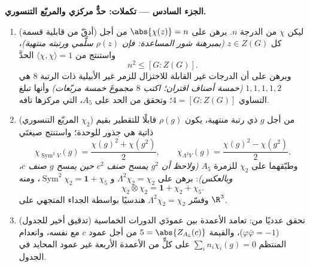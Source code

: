 \begin{problem}
\medskip
\noindent\textbf{الجزء السادس --- تكملات: حدٌّ مركزي والمربّع
التنسوري.}
\begin{enumerate}[resume]
  \item (أدقّ من قابلية قسمة) ليكن $\chi$  من
        الدرجة $n$. برهن على $\abs{\chi(z)} = n$ من أجل كل $z \in Z(G)$
        \emph{(بمبرهنة شور المساعدة: فإن $\rho(z)$ سلَّمي ورتبته
        منتهية)}، واستنتج من $\langle\chi, \chi\rangle = 1$ الحدَّ
        \[
        n^2 \leq [G : Z(G)] .
        \]
        وبرهن على أن الدرجات غير القابلة للاختزال للزمر غير
        الأبيلية ذات الرتبة $8$ هي $1, 1, 1, 1, 2$ \emph{(خمسة
        أصناف اقتران؛ اكتب $8$ مجموعَ خمسة مربّعات)} وأنها تبلغ
        التساوي $4 = [G : Z(G)]$؛ وتحقق من الحد على $A_5$، التي
        مركزها تافه.
  \item (المربّع التنسوري  $\chi_2$) من أجل $g$ ذي رتبة
        منتهية، يكون $\rho(g)$ قابلًا للتقطير بقيم ذاتية هي جذور
        للوحدة؛ واستنتج صيغتَي 
        \[
        \chi_{\operatorname{Sym}^2 V}(g)
        = \frac{\chi(g)^2 + \chi(g^2)}2,
        \qquad
        \chi_{\Lambda^2 V}(g)
        = \frac{\chi(g)^2 - \chi(g^2)}2 .
        \]
        وطبّقهما على $\chi_2$ للزمرة $A_5$ \emph{(ولاحظ أن $g^2$
        يمسح صنف $c^2$ حين يمسح $g$ صنف $c$، وبالعكس)}: برهن على
        $\Lambda^2\chi_2 =
        \chi_2$ و $\operatorname{Sym}^2\chi_2 = \mathbf 1 +
        \chi_5$، ومنه
        \[
        \chi_2\otimes\chi_2 = \mathbf 1 + \chi_2 + \chi_5 .
        \]
        وفسّر $\Lambda^2\chi_2 = \chi_2$ هندسيًا بواسطة الجداء المتجهي على $\R^3$.
  \item (تدقيق أخير للجدول) تحقق عدديًا من: تعامد الأعمدة بين
        عمودَي الدورات الخماسية ($\varphi\bar\varphi = -1$)، والقيمة $5 =
        \abs{Z_{A_5}(c)}$ من
        أجل عمود $c$ مع نفسه، وانعدام  المنتظم $\sum_i
        n_i\chi_i(g) = 0$ على
        كلٍّ من الأعمدة الأربعة غير عمود المحايد في الجدول.
\end{enumerate}
\end{problem}
